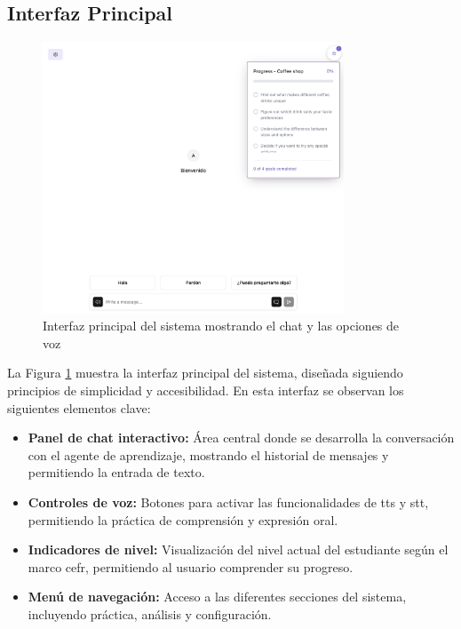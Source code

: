 \subsection{Interfaz Principal}
\label{interfaz-principal}

\begin{figure}[H]
    \centering
    \includegraphics[width=0.8\textwidth]{figuras/screenshots/chat-initial.png}
    \caption{Interfaz principal del sistema mostrando el chat y las opciones de voz}
    \label{fig:main-interface}
\end{figure}


La Figura \ref{fig:main-interface} muestra la interfaz principal del sistema, diseñada siguiendo principios de simplicidad y accesibilidad. En esta interfaz se observan los siguientes elementos clave:

\begin{itemize}
    \item \textbf{Panel de chat interactivo:} Área central donde se desarrolla la conversación con el agente de aprendizaje, mostrando el historial de mensajes y permitiendo la entrada de texto.
    
    \item \textbf{Controles de voz:} Botones para activar las funcionalidades de \gls{tts} y \gls{stt}, permitiendo la práctica de comprensión y expresión oral.
    
    \item \textbf{Indicadores de nivel:} Visualización del nivel actual del estudiante según el marco \gls{cefr}, permitiendo al usuario comprender su progreso.
    
    \item \textbf{Menú de navegación:} Acceso a las diferentes secciones del sistema, incluyendo práctica, análisis y configuración.
\end{itemize}

